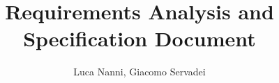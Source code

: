 \documentclass[a4paper]{report}
\begin{document}
\title{\textbf{R}equirements \textbf{A}nalysis and \textbf{S}pecification \textbf{D}ocument}
\author{Luca Nanni, Giacomo Servadei}
\maketitle

\tableofcontents




\end{document}
